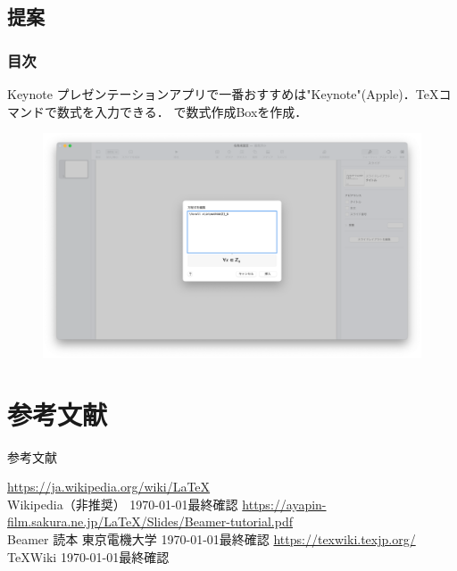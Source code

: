 \documentclass[dvipdfmx]{beamer}
\begin{document}
\subsection{提案}
\begin{frame}
\frametitle{目次}
\tableofcontents[currentsection,sectionstyle=show/shaded,subsectionstyle=show/shaded]
\end{frame}
\begin{frame}[fragile]{Keynote}
    プレゼンテーションアプリで一番おすすめは"Keynote"(Apple)．\TeX コマンドで数式を入力できる．
    で数式作成Boxを作成．
    \begin{figure}[h]
        \centering
        \includegraphics[scale = 0.2]{fig2.png}
    \end{figure}
\end{frame}


\section{参考文献}
\begin{frame}{参考文献}
    \begin{thebibliography}{99}
         \url{https://ja.wikipedia.org/wiki/LaTeX}\\
        \hspace{3em}Wikipedia（非推奨） \today 最終確認
         \url{https://ayapin-film.sakura.ne.jp/LaTeX/Slides/Beamer-tutorial.pdf}\\
        \hspace{3em}Beamer 読本 東京電機大学 \today 最終確認
         \url{https://texwiki.texjp.org/}\\
        \hspace{3em}\TeX Wiki \today 最終確認
    \end{thebibliography}
\end{frame}
\end{document}
